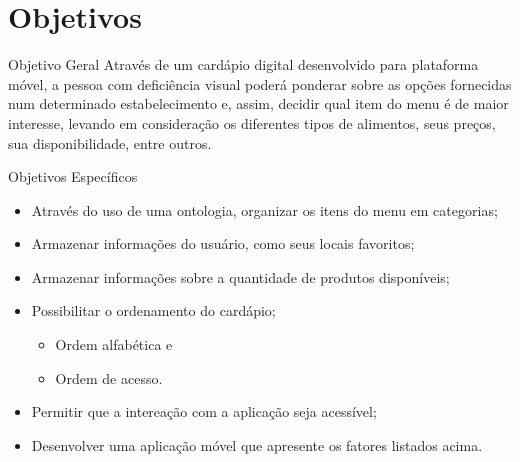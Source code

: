 \section{Objetivos}\label{sec:objetivos}
\begin{frame}[allowframebreaks]{Objetivo Geral}
	Através de um cardápio digital desenvolvido para plataforma móvel, a pessoa com deficiência visual poderá ponderar sobre as opções fornecidas num determinado estabelecimento e, assim, decidir qual item do menu é de maior interesse, levando em consideração os diferentes tipos de alimentos, seus preços, sua disponibilidade, entre outros.
\end{frame}

\begin{frame}[allowframebreaks]{Objetivos Específicos}
	\begin{itemize}
		\setlength{\itemsep}{0.5em}
		\item<1-> Através do uso de uma ontologia, organizar os itens do menu em categorias;
		\item<1-> Armazenar informações do usuário, como seus locais favoritos;
		\item<1-> Armazenar informações sobre a quantidade de produtos disponíveis;
		\item<1-> Possibilitar o ordenamento do cardápio;
			\begin{itemize}
				\setlength{\itemsep}{0.5em}
				\item<1-> Ordem alfabética e
				\item<1-> Ordem de acesso. 
			\end{itemize}
		\item<1-> Permitir que a intereação com a aplicação seja acessível;
		\item<1-> Desenvolver uma aplicação móvel que apresente os fatores listados acima.
	\end{itemize}
\end{frame}